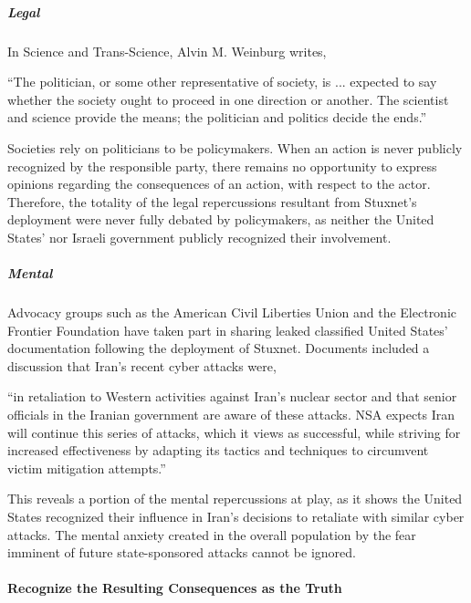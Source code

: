 \documentclass[12pt]{article}
\begin{document}
\begin{multicols}{2}
\subparagraph{Legal}

In Science and Trans-Science, Alvin M. Weinburg writes,

\begin{displayquote}
``The politician, or some other representative of society, is ... expected to say whether the society ought to proceed in one direction or another. The scientist and science provide the means; the politician and politics decide the ends.''\cite{scienceAndTransScience}
\end{displayquote}

Societies rely on politicians to be policymakers. When an action is never publicly recognized by the responsible party, there remains no opportunity to express opinions regarding the consequences of an action, with respect to the actor. Therefore, the totality of the legal repercussions resultant from Stuxnet's deployment were never fully debated by policymakers, as neither the United States' nor Israeli government publicly recognized their involvement.

\subparagraph{Mental}

Advocacy groups such as the American Civil Liberties Union and the Electronic Frontier Foundation have taken part in sharing leaked classified United States' documentation following the deployment of Stuxnet. Documents included a discussion that Iran's recent cyber attacks were, 

\begin{displayquote}
``in retaliation to Western activities against Iran's nuclear sector and that senior officials in the Iranian government are aware of these attacks. NSA expects Iran will continue this series of attacks, which it views as successful, while striving for increased effectiveness by adapting its tactics and techniques to circumvent victim mitigation attempts.''\cite{effForwardsIranDiscussion}\cite{acluForwardsIranDiscussion}
\end{displayquote}

This reveals a portion of the mental repercussions at play, as it shows the United States recognized their influence in Iran's decisions to retaliate with similar cyber attacks. The mental anxiety created in the overall population by the fear imminent of future state-sponsored attacks cannot be ignored. 

\paragraph{Recognize the Resulting Consequences as the Truth}


\end{multicols}
\end{document}
